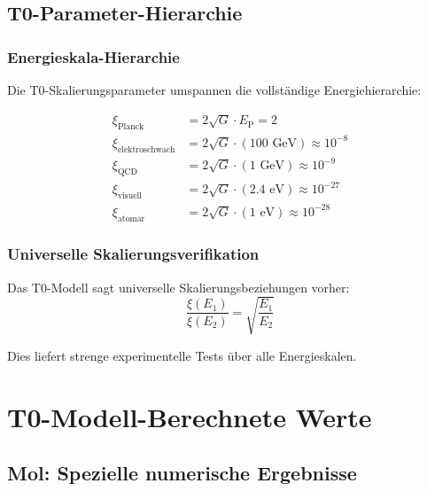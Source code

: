\documentclass[12pt,a4paper]{article}
\newcommand{\xipar}{\xi}
\newcommand{\EP}{E_{\text{P}}}
\begin{document}
	\subsection{T0-Parameter-Hierarchie}
	\label{subsec:t0_parameter_hierarchie}
	
	\subsubsection{Energieskala-Hierarchie}
	\label{subsubsec:energieskala_hierarchie}
	
	Die T0-Skalierungsparameter umspannen die vollständige Energiehierarchie:
	
	\begin{align}
		\xipar_{\text{Planck}} &= 2\sqrt{G} \cdot \EP = 2 \\
		\xipar_{\text{elektroschwach}} &= 2\sqrt{G} \cdot (100 \text{ GeV}) \approx 10^{-8} \\
		\xipar_{\text{QCD}} &= 2\sqrt{G} \cdot (1 \text{ GeV}) \approx 10^{-9} \\
		\xipar_{\text{visuell}} &= 2\sqrt{G} \cdot (2.4 \text{ eV}) \approx 10^{-27} \\
		\xipar_{\text{atomar}} &= 2\sqrt{G} \cdot (1 \text{ eV}) \approx 10^{-28}
	\end{align}
	
	\subsubsection{Universelle Skalierungsverifikation}
	\label{subsubsec:universelle_skalierungsverifikation}
	
	Das T0-Modell sagt universelle Skalierungsbeziehungen vorher:
	\begin{equation}
		\frac{\xipar(E_1)}{\xipar(E_2)} = \sqrt{\frac{E_1}{E_2}}
		\label{eq:universeller_skalierungstest}
	\end{equation}
	
	Dies liefert strenge experimentelle Tests über alle Energieskalen.
	
	\section{T0-Modell-Berechnete Werte}
	\label{sec:t0_berechnete_werte}
	
	\subsection{Mol: Spezielle numerische Ergebnisse}
	\label{subsec:mol_numerische_ergebnisse}
	
\end{document}

